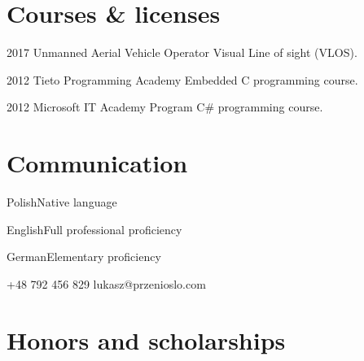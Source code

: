 \documentclass{tccv}
\begin{document}
\section{Courses \& licenses}

\begin{yearlist}

\item{2017}
     {Unmanned Aerial Vehicle Operator}
     {Visual Line of sight (VLOS).}

\item{2012}
     {Tieto Programming Academy}
     {Embedded C programming course.}

\item{2012}
     {Microsoft IT Academy Program }
     {C\# programming course.}

\end{yearlist}

\section{Communication}

\begin{factlist}
\item{Polish}{Native language}
\item{English}{Full professional proficiency}
\item{German}{Elementary proficiency}
\end{factlist}

    {+48 792 456 829}
    {lukasz@przenioslo.com}
    
\section{Honors and scholarships}
\end{document}
